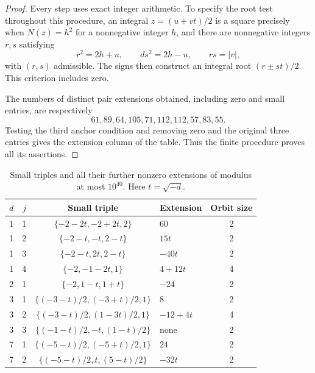 \documentclass[12pt]{article}
\numberwithin{equation}{section}
\begin{document}
\begin{proof}
Every step uses exact integer arithmetic. To specify the root test throughout this procedure, an integral $z=(u+vt)/2$ is a square precisely when $N(z)=h^2$ for a nonnegative integer $h$, and there are nonnegative integers $r,s$ satisfying
\[
 r^2=2h+u,\qquad ds^2=2h-u,\qquad rs=|v|,
\]
with $(r,s)$ admissible. The signs then construct an integral root $(r\pm st)/2$. This criterion includes zero.

The numbers of distinct pair extensions obtained, including zero and small entries, are respectively
\[
 61,89,64,105,71,112,112,57,83,55.
\]
Testing the third anchor condition and removing zero and the original three entries gives the extension column of the table. Thus the finite procedure proves all its assertions.
\end{proof}

\begin{table}[htbp]
\centering
\begin{tabular}{ccclc}
\toprule
$d$&$j$&Small triple&Extension&Orbit size\\
\midrule
1&1&$\{-2-2t,-2+2t,2\}$&$60$&2\\
1&2&$\{-2-t,-t,2-t\}$&$15t$&2\\
1&3&$\{-2-t,2t,2-t\}$&$-40t$&2\\
1&4&$\{-2,-1-2t,1\}$&$4+12t$&4\\
2&1&$\{-2,1-t,1+t\}$&$-24$&2\\
3&1&$\{(-3-t)/2,(-3+t)/2,1\}$&$8$&2\\
3&2&$\{(-3-t)/2,(1-3t)/2,1\}$&$-12+4t$&4\\
3&3&$\{(-1-t)/2,-t,(1-t)/2\}$&none&2\\
7&1&$\{(-5-t)/2,(-5+t)/2,1\}$&$24$&2\\
7&2&$\{(-5-t)/2,t,(5-t)/2\}$&$-32t$&2\\
\bottomrule
\end{tabular}
\caption{Small triples and all their further nonzero extensions of modulus at most $10^{40}$. Here $t=\sqrt{-d}$.}
\label{sm:six-small-triples-table}
\end{table}
\end{document}
